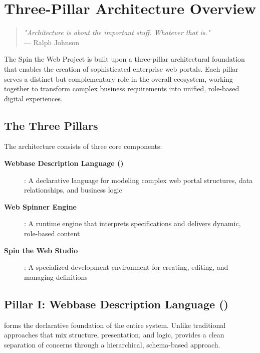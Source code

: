 
\chapter{Three-Pillar Architecture Overview}
\label{chap:architecture}

\begin{quote}
\textit{"Architecture is about the important stuff. Whatever that is."} \\
— Ralph Johnson
\end{quote}

The Spin the Web Project is built upon a three-pillar architectural foundation that enables the creation of sophisticated enterprise web portals. Each pillar serves a distinct but complementary role in the overall ecosystem, working together to transform complex business requirements into unified, role-based digital experiences.

\section{The Three Pillars}
\label{sec:three-pillars}

The architecture consists of three core components:

\begin{description}
\item[\textbf{Webbase Description Language (\wbdl{})}]: A declarative language for modeling complex web portal structures, data relationships, and business logic
\item[\textbf{Web Spinner Engine}]: A runtime engine that interprets \wbdl{} specifications and delivers dynamic, role-based content
\item[\textbf{Spin the Web Studio}]: A specialized development environment for creating, editing, and managing \webbase{} definitions
\end{description}

\section{Pillar I: Webbase Description Language (\wbdl{})}
\label{sec:pillar-wbdl}

\wbdl{} forms the declarative foundation of the entire system. Unlike traditional approaches that mix structure, presentation, and logic, \wbdl{} provides a clean separation of concerns through a hierarchical, schema-based approach.

